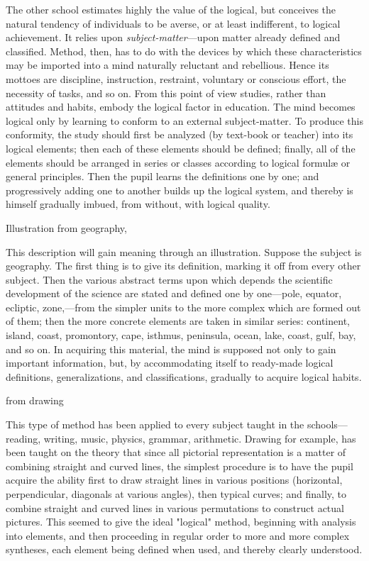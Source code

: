 \documentclass[letterpaper]{book}
\begin{document}
The other school estimates highly the value of the logical, but
conceives the natural tendency of individuals to be averse, or at least
indifferent, to logical achievement. It relies upon
\emph{subject-matter}---upon matter already defined and classified.
Method, then, has to do with the devices by which these characteristics
may be imported into a mind naturally reluctant and
rebellious.
Hence its mottoes are discipline, instruction, restraint, voluntary or
conscious effort, the necessity of tasks, and so on. From this point of
view studies, rather than attitudes and habits, embody the logical
factor in education. The mind becomes logical only by learning to
conform to an external subject-matter. To produce this conformity, the
study should first be analyzed (by text-book or teacher) into its
logical elements; then each of these elements should be defined;
finally, all of the elements should be arranged in series or classes
according to logical formulæ or general principles. Then the pupil
learns the definitions one by one; and progressively adding one to
another builds up the logical system, and thereby is himself gradually
imbued, from without, with logical quality.

Illustration from geography,

This description will gain meaning through an illustration. Suppose the
subject is geography. The first thing is to give its definition, marking
it off from every other subject. Then the various abstract terms upon
which depends the scientific development of the science are stated and
defined one by one---pole, equator, ecliptic, zone,---from the simpler
units to the more complex which are formed out of them; then the more
concrete elements are taken in similar series: continent, island, coast,
promontory, cape, isthmus, peninsula, ocean, lake, coast, gulf, bay, and
so on. In acquiring this material, the mind is supposed not only to gain
important information, but, by accommodating itself to ready-made
logical definitions, generalizations, and classifications, gradually to
acquire logical habits.

from drawing

This type of method has been applied to every subject taught in the
schools---reading, writing, music, physics, grammar, arithmetic. Drawing
for
example,
has been taught on the theory that since all pictorial representation is
a matter of combining straight and curved lines, the simplest procedure
is to have the pupil acquire the ability first to draw straight lines in
various positions (horizontal, perpendicular, diagonals at various
angles), then typical curves; and finally, to combine straight and
curved lines in various permutations to construct actual pictures. This
seemed to give the ideal "logical" method, beginning with analysis into
elements, and then proceeding in regular order to more and more complex
syntheses, each element being defined when used, and thereby clearly
understood.
\end{document}
